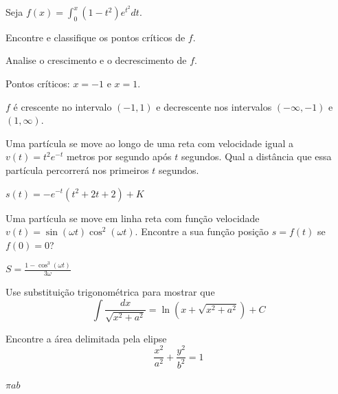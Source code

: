 \begin{exercises*}
\begin{exercise}
Seja \(f(x)=\int_0^x (1-t^2)e^{t^2} dt\).
\begin{alphalist}
  \item Encontre e classifique os pontos críticos de $f$.
  \item Analise o crescimento e o decrescimento de $f$.
\end{alphalist}
\begin{answer}
\begin{alphalist}
  \item Pontos críticos: $x=-1$ e $x=1$.
  \item $f$ é crescente no intervalo $(-1,1)$ e
        decrescente nos intervalos $(-\infty,-1)$ e $(1, \infty)$.
\end{alphalist}
\end{answer}
\end{exercise}

\begin{exercise}
Uma partícula se move ao longo de uma reta com velocidade igual a
$v(t)=t^2e^{-t}$ metros por segundo após $t$ segundos.
Qual a distância que essa partícula percorrerá nos primeiros $t$ segundos.
\begin{answer}
  $s(t)=-e^{-t}(t^2+2t+2)+K$
\end{answer}
\end{exercise}

\begin{exercise}
Uma partícula se move em linha reta com função velocidade
$v(t)= \sin(\omega t) \cos^2(\omega t)$.
Encontre a sua função posição $s=f(t) $ se $f(0)=0$?
\begin{answer}
  \(S=\frac{1-\cos^3(\omega t)}{3\omega}\)
\end{answer}
\end{exercise}

\begin{exercise}
Use substituição trigonométrica para mostrar que
\[
  \int \frac{dx}{\sqrt{x^2+a^2}}= \ln(x+\sqrt{x^2+a^2})+C
\]
\end{exercise}


\begin{exercise}
Encontre a área delimitada pela elipse
\[
  \frac{x^2}{a^2}+\frac{y^2}{b^2}=1
\]
\begin{answer}
  $\pi ab$
\end{answer}
\end{exercise}


\end{exercises*}
